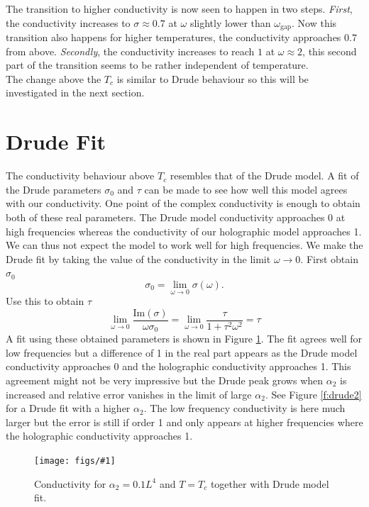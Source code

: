 \documentclass[12pt]{report}
\newcommand{\im}{\ensuremath{\mathrm{Im}}}
\newcommand{\fig}[2]{
\begin{figure}
\centering
\texttt{[image: figs/\#1]}
\caption{#2}
\end{figure}
}
\begin{document}
The transition to higher conductivity is now seen to happen in two steps. \emph{First}, the conductivity increases to $\sigma\approx0.7$ at $\omega$ slightly lower than $\omega_\mathrm{gap}$. Now this transition also happens for higher temperatures, the conductivity approaches $0.7$ from above. \emph{Secondly}, the conductivity increases to reach $1$ at $\omega\approx2$, this second part of the transition seems to be rather independent of temperature.\\

The change above the $T_c$ is similar to Drude behaviour so this will be investigated in the next section.
\section{Drude Fit}
The conductivity behaviour above $T_c$ resembles that of the Drude model. A fit of the Drude parameters $\sigma_0$ and $\tau$ can be made to see how well this model agrees with our conductivity. One point of the complex conductivity is enough to obtain both of these real parameters. The Drude model conductivity approaches 0 at high frequencies whereas the conductivity of our holographic model approaches 1. We can thus not expect the model to work well for high frequencies. We make the Drude fit by taking the value of the conductivity in the limit $\omega\rightarrow0$. First obtain $\sigma_0$
\begin{equation}
 \sigma_0=\lim_{\omega\rightarrow0}\sigma(\omega).
\end{equation}
Use this to obtain $\tau$
\begin{equation}
\lim_{\omega\rightarrow0}\frac{\im (\sigma)}{\omega\sigma_0}=\lim_{\omega\rightarrow0}\frac{\tau}{1+\tau^2\omega^2}=\tau
\end{equation}
A fit using these obtained parameters is shown in Figure \ref{f:drude}. The fit agrees well for low frequencies but a difference of 1 in the real part appears as the Drude model conductivity approaches 0 and the holographic conductivity approaches 1. This agreement might not be very impressive but the Drude peak grows when $\alpha_2$ is increased and relative error vanishes in the limit of large $\alpha_2$. See Figure \ref{f:drude2} for a Drude fit with a higher $\alpha_2$. The low frequency conductivity is here much larger but the error is still if order 1 and only appears at higher frequencies where the holographic conductivity approaches 1.

\fig{drude_T_1Tc_a2_0.1}{Conductivity for $\alpha_2=0.1L^4$ and $T=T_c$ together with Drude model fit.\label{f:drude}}
\end{document}
